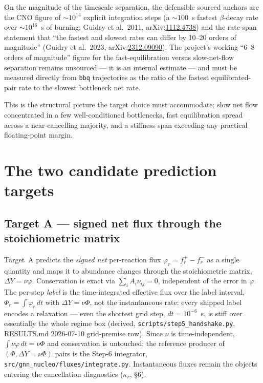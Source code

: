 \documentclass[11pt]{article}
\newcommand{\arxiv}[1]{arXiv:\href{https://arxiv.org/abs/#1}{#1}}
\begin{document}
On the magnitude of the timescale separation, the defensible sourced anchors are the CNO figure of $\sim 10^{14}$ explicit integration steps (a $\sim 100$~s fastest $\beta$-decay rate over $\sim 10^{16}$~s of burning; Guidry et al.\ 2011, \arxiv{1112.4738}) and the rate-span statement that ``the fastest and slowest rates can differ by 10--20 orders of magnitude'' (Guidry et al.\ 2023, \arxiv{2312.09090}). The project's working ``6--8 orders of magnitude'' figure for the fast-equilibration versus slow-net-flow separation remains unsourced --- it is an internal estimate --- and must be measured directly from \texttt{bbq} trajectories as the ratio of the fastest equilibrated-pair rate to the slowest bottleneck net rate.

This is the structural picture the target choice must accommodate: slow net flow concentrated in a few well-conditioned bottlenecks, fast equilibration spread across a near-cancelling majority, and a stiffness span exceeding any practical floating-point margin.

\section{The two candidate prediction targets}

\subsection{Target A --- signed net flux through the stoichiometric matrix}

Target~A predicts the \emph{signed net} per-reaction flux $\varphi_r = f_r^+ - f_r^-$ as a single quantity and maps it to abundance changes through the stoichiometric matrix, $\Delta Y = \nu\varphi$. Conservation is exact via $\sum_i A_i \nu_{ij} = 0$, independent of the error in $\varphi$. The per-step \emph{label} is the time-integrated effective flux over the label interval, $\Phi_r = \int \varphi_r\,dt$ with $\Delta Y = \nu\Phi$, not the instantaneous rate: every shipped label encodes a relaxation --- even the shortest grid step, $dt = 10^{-6}$~s, is stiff over essentially the whole regime box (derived, \texttt{scripts/step5\_handshake.py}, RESULTS.md 2026-07-10 grid-premise row). Since $\nu$ is time-independent, $\int \nu\varphi\,dt = \nu\Phi$ and conservation is untouched; the reference producer of $(\Phi, \Delta Y = \nu\Phi)$ pairs is the Step-6 integrator, \texttt{src/gnn\_nucleo/fluxes/integrate.py}. Instantaneous fluxes remain the objects entering the cancellation diagnostics ($\kappa_r$, \S6).
\end{document}
